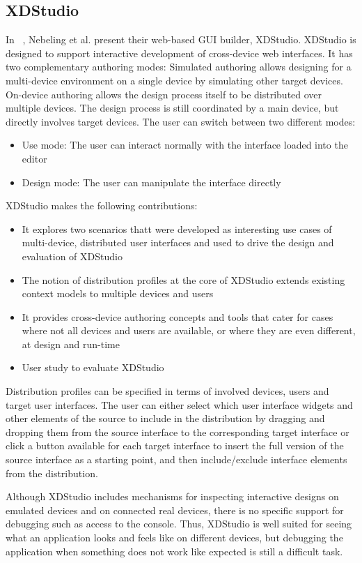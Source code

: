 \subsection{XDStudio}

In ~\cite{xdstudio2014}, Nebeling et al. present their web-based GUI builder, XDStudio. XDStudio is designed to support interactive development of cross-device web interfaces. It has two complementary authoring modes: Simulated authoring allows designing for a multi-device environment on a single device by simulating other target devices. On-device authoring allows the design process itself to be distributed over multiple devices. The design process is still coordinated by a main device, but directly involves target devices. The user can switch between two different modes:
\begin{itemize}
	\item Use mode: The user can interact normally with the interface loaded into the editor
	\item Design mode: The user can manipulate the interface directly
\end{itemize}
XDStudio makes the following contributions:
\begin{itemize}
	\item It explores two scenarios thatt were developed as interesting use cases of multi-device, distributed user interfaces and used to drive the design and evaluation of XDStudio
	\item The notion of distribution profiles at the core of XDStudio extends existing context models to multiple devices and users
	\item It provides cross-device authoring concepts and tools that cater for cases where not all devices and users are available, or where they are even different, at design and run-time
	\item User study to evaluate XDStudio
\end{itemize}
Distribution profiles can be specified in terms of involved devices, users and target user interfaces. The user can either select which user interface widgets and other elements of the source to include in the distribution by dragging and dropping them from the source interface to the corresponding target interface or click a button available for each target interface to insert the full version of the source interface as a starting point, and then include/exclude interface elements from the distribution.

Although XDStudio includes mechanisms for inspecting interactive designs on emulated devices and on connected real devices, there is no specific support for debugging such as access to the console. Thus, XDStudio is well suited for seeing what an application looks and feels like on different devices, but debugging the application when something does not work like expected is still a difficult task.

